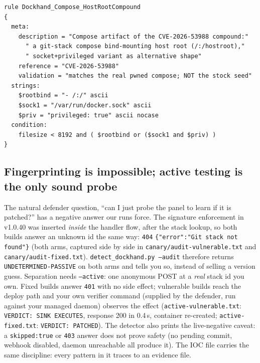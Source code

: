 \documentclass[journal]{IEEEtran}
\begin{document}
\begin{lstlisting}[style=yar,label={lst:yara},
caption={\texttt{detection/rules/}\allowbreak\texttt{yara/}\allowbreak\texttt{dockhand\_}\allowbreak\texttt{compose\_takeover.yar}
(meta text abridged): matches the compound's artifact shape, validated against
the real pwned compose and the stock seed}]
rule Dockhand_Compose_HostRootCompound
{
  meta:
    description = "Compose artifact of the CVE-2026-53988 compound:"
      " a git-stack compose bind-mounting host root (/:/hostroot),"
      " socket+privileged variant as alternative shape"
    reference = "CVE-2026-53988"
    validation = "matches the real pwned compose; NOT the stock seed"
  strings:
    $rootbind = "- /:/" ascii
    $sock1 = "/var/run/docker.sock" ascii
    $priv = "privileged: true" ascii nocase
  condition:
    filesize < 8192 and ( $rootbind or ($sock1 and $priv) )
}
\end{lstlisting}

\subsection{Fingerprinting is impossible; active testing is the only sound probe}
\label{sec:fingerprint}

The natural defender question, ``can I just probe the panel to learn if it is
patched?'' has a negative answer our runs force. The signature enforcement in
v1.0.40 was inserted \emph{inside} the handler flow, after the stack lookup,
so both builds answer an unknown id the same way: \texttt{404}
\texttt{\{"error":"Git stack not found"\}} (both arms, captured side by side
in \texttt{canary/audit-}\allowbreak\texttt{vulnerable.txt} and
\texttt{canary/audit-fixed.txt}). \texttt{detect\_dockhand.py --audit}
therefore returns \texttt{UNDETERMINED-PASSIVE} on both arms and tells you so,
instead of selling a version guess. Separation needs \texttt{--active}: one
anonymous POST at a \emph{real} stack id you own. Fixed builds answer
\texttt{401} with no side effect; vulnerable builds reach the deploy path and
your own verifier command (supplied by the defender, run against your managed
daemon) observes the effect
(\texttt{active-vulnerable.txt}: \texttt{VERDICT: SINK EXECUTES}, response
200 in 0.4\,s, container re-created; \texttt{active-fixed.txt}:
\texttt{VERDICT: PATCHED}). The detector also prints the live-negative
caveat: a \texttt{skipped:true} or \texttt{403} answer does not prove safety
(no pending commit, webhook disabled, daemon unreachable all produce it).
The IOC file carries the same discipline: every pattern in it traces to an
evidence file.
\end{document}
